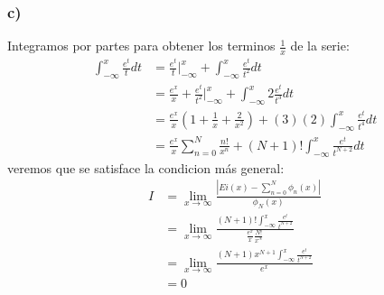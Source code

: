 \documentclass{article}
\begin{document}
\begin{tcolorbox}[breakable]
    \subsubsection*{c)}
    Integramos por partes para obtener los terminos $\frac{1}{x}$ de la serie:
    \begin{align*}
        \int_{-\infty}^x \frac{e^t}{t}dt 
        &= \frac{e^t}{t} \Big|_{-\infty}^x + \int_{-\infty}^x \frac{e^t}{t^2}dt \\
        &= \frac{e^x}{x} + \frac{e^t}{t^2} \Big|_{-\infty}^x + \int_{-\infty}^x 2 \frac{e^t}{t^3}dt \\
        &= \frac{e^x}{x} \left(1 + \frac{1}{x} + \frac{2}{x^2} \right) + (3)(2) \int_{-\infty}^x \frac{e^t}{t^4} dt \\
        &= \frac{e^x}{x} \sum_{n=0}^N \frac{n!}{x^n} + (N+1)!\int_{-\infty}^x \frac{e^t}{t^{N+2}}dt 
    \end{align*}
    veremos que se satisface la condicion más general:
    \begin{align*}
        I 
        &=\lim_{x\to \infty} \frac{|Ei(x) - \sum_{n=0}^N \phi_n(x)|}{\phi_N(x)} \\
        &=\lim_{x\to \infty} \frac{(N+1)! \int_{-\infty}^x \frac{e^t}{t^{N+2}}}{\frac{e^x}{x}\frac{N!}{x^N}} \\
        &=\lim_{x\to \infty} \frac{(N+1)x^{N+1}\int_{-\infty}^x \frac{e^t}{t^{N+2}}}{e^x} \\
        &= 0
    \end{align*}
\end{tcolorbox}
\end{document}
